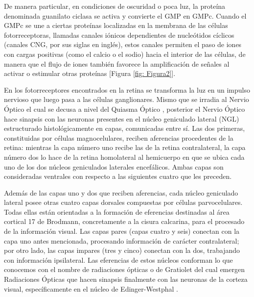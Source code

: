 \documentclass[10pt]{article}
\begin{document}
\setlength{\parskip}{2mm}

De manera particular, en condiciones de oscuridad o poca luz, la proteína denominada guanilato ciclasa se activa y convierte el GMP en GMPc. Cuando el GMPc se une a ciertas proteínas localizadas en la membrana de las células fotorreceptoras, llamadas canales iónicos dependientes de nucleótidos cíclicos (canales CNG, por sus siglas en inglés), estos canales permiten el paso de iones con cargas positivas (como el calcio o el sodio) hacia el interior de las células, de manera que el flujo de iones también favorece la amplificación de señales al activar o estimular otras proteínas \cite{IEEEreferencias:Ref12} [Figura \ref{fig: Figura2}].

\setlength{\parskip}{2mm}

En los fotorreceptores encontrados en la retina se transforma la luz en un impulso nervioso que luego pasa a las células ganglionares.  Mismo que se irradia al Nervio Óptico el cual se decusa a nivel del Quiasma Óptico \cite{IEEEreferencias:Ref14}, posterior el Nervio Óptico hace sinapsis con las neuronas presentes en el núcleo geniculado lateral (NGL) estructurado histológicamente en capas, comunicadas entre sí. Las dos primeras, constituidas por células magnocelulares, reciben aferencias procedentes de la retina: mientras la capa número uno recibe las de la retina contralateral, la capa número dos lo hace de la retina homolateral al hemicuerpo en que se ubica cada uno de los dos núcleos geniculados laterales encefálicos. Ambas capas son consideradas ventrales con respecto a las siguientes cuatro que les preceden\cite{IEEEreferencias:Ref15}.

\setlength{\parskip}{2mm}

Además de las capas uno y dos que reciben aferencias, cada núcleo geniculado lateral posee otras cuatro capas dorsales compuestas por células parvocelulares. Todas ellas están orientadas a la formación de eferencias destinadas al área cortical 17 de Brodmann, concretamente a la cisura calcarina, para el procesado de la información visual. Las capas pares (capas cuatro y seis) conectan con la capa uno antes mencionada, procesando información de carácter contralateral; por otro lado, las capas impares (tres y cinco) conectan con la dos, trabajando con información ipsilateral. Las eferencias de estos núcleos conforman lo que conocemos con el nombre de radiaciones ópticas o de Gratiolet\cite{IEEEreferencias:Ref15} del cual emergen Radiaciones Ópticas que hacen sinapsis finalmente con las neuronas de la corteza visual, específicamente en el núcleo de Edinger-Westphal \cite{IEEEreferencias:Ref14}.
\end{document}
